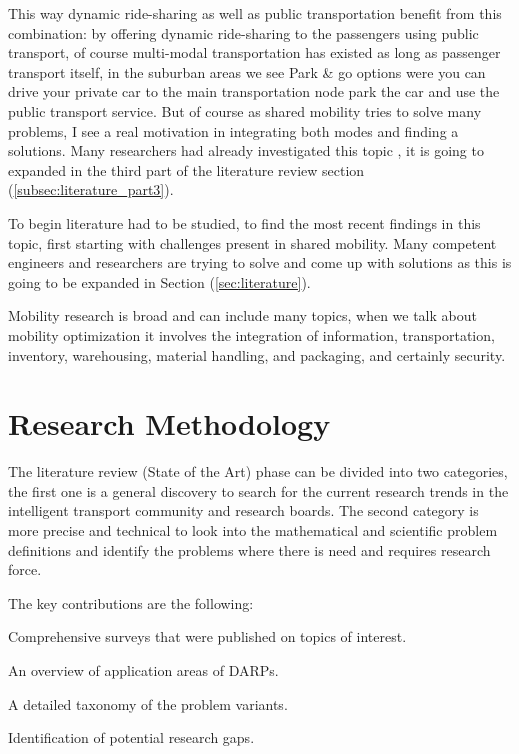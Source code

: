 \documentclass{article}
\begin{document}
This way dynamic ride-sharing as well as public transportation benefit from this combination: by offering dynamic ride-sharing to the passengers using public transport, of course multi-modal transportation has existed as long as passenger transport itself, in the suburban areas we see Park \& go options were you can drive your private car to the main transportation node park the car and use the public transport service. But of course as shared mobility tries to solve many problems, I see a real motivation in integrating both modes and finding a solutions. Many researchers had already investigated this topic \cite{Bast_2016}, it is going to expanded in the third part of the literature review section (\ref{subsec:literature_part3}).


To begin literature had to be studied, to find the most recent findings in this topic, first starting with challenges present in shared mobility. Many competent engineers and researchers are trying to solve and come up with solutions as this is going to be expanded in Section (\ref{sec:literature}).


Mobility research is broad and can include many topics, when we talk about mobility optimization it  involves the integration of information, transportation, inventory, warehousing, material handling, and packaging, and certainly security.

\section{Research Methodology}
\label{sec:Methodology}

The literature review (State of the Art) phase can be divided into two categories, the first one is a general discovery to search for the current research trends in the intelligent transport community and research boards. The second category is more precise and technical 
to look into the mathematical and scientific problem definitions and identify the problems where there is need and requires research force.

The key contributions are the following:
\begin{enumerate}{
\item Comprehensive surveys that were published on topics of interest.
\item An overview of application areas of DARPs.
\item A detailed taxonomy of the problem variants.
\item Identification of potential research gaps.}
\end{enumerate}
\end{document}
